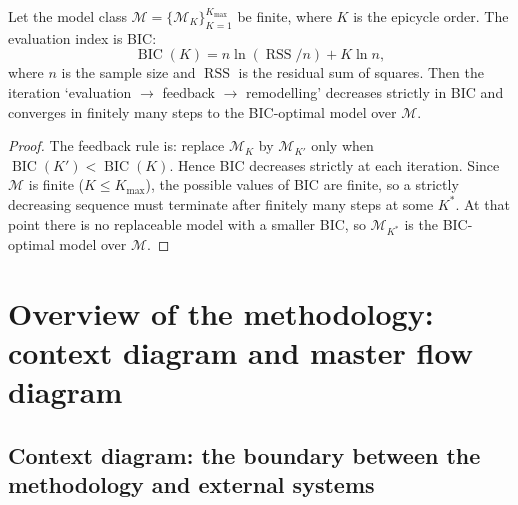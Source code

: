 \begin{lemma}\label{ch34_pipeline_closure}
Let the model class $\mathcal{M} = \{\mathcal{M}_K\}_{K=1}^{K_{\max}}$ be finite, where $K$ is the epicycle order. The evaluation index is BIC:
\[
\operatorname{BIC}(K) = n\ln(\operatorname{RSS}/n) + K\ln n,
\]
where $n$ is the sample size and $\operatorname{RSS}$ is the residual sum of squares. Then the iteration `evaluation $\to$ feedback $\to$ remodelling' decreases strictly in BIC and converges in finitely many steps to the BIC-optimal model over $\mathcal{M}$.
\end{lemma}

\begin{proof}
The feedback rule is: replace $\mathcal{M}_K$ by $\mathcal{M}_{K'}$ only when $\operatorname{BIC}(K') < \operatorname{BIC}(K)$. Hence BIC decreases strictly at each iteration. Since $\mathcal{M}$ is finite ($K \le K_{\max}$), the possible values of BIC are finite, so a strictly decreasing sequence must terminate after finitely many steps at some $K^*$. At that point there is no replaceable model with a smaller BIC, so $\mathcal{M}_{K^*}$ is the BIC-optimal model over $\mathcal{M}$.
\end{proof}

\section{Overview of the methodology: context diagram and master flow diagram}

\subsection{Context diagram: the boundary between the methodology and external systems}

